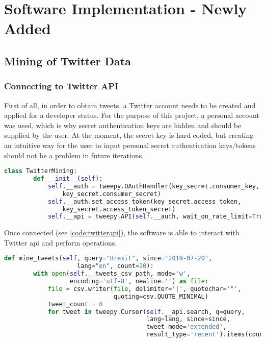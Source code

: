\section{Software Implementation - Newly Added}
    
    \subsection{Mining of Twitter Data} \label{twitterdata}
        \subsubsection{Connecting to Twitter API}
            First of all, in order to obtain tweets, a Twitter account needs to be created and applied for a developer status. For the purpose of this project, a personal account was used, which is why secret authentication keys are hidden and should be supplied by the user. At the moment, the secret key is hard coded, but creating an intuitive way for the user to input personal secret authentication keys/tokens should not be a problem in future iterations.
            
            \begin{lstlisting}[language=Python, caption=Connecting Twitter API, label=code:twitterapi]
    class TwitterMining:
        def __init__(self):
            self.__auth = tweepy.OAuthHandler(key_secret.consumer_key, 
                key_secret.consumer_secret)
            self.__auth.set_access_token(key_secret.access_token, 
                key_secret.access_token_secret)
            self.__api = tweepy.API(self.__auth, wait_on_rate_limit=True)
            \end{lstlisting}
            \FloatBarrier
            
            Once connected (see \cref{code:twitterapi}), the software is able to interact with Twitter \gls{api} and perform operations.
            
            \begin{lstlisting}[language=Python, caption=Starting Data Mining, label=code:twitterstream]
    def mine_tweets(self, query="Brexit", since="2019-07-20",
                    lang="en", count=20):
        with open(self.__tweets_csv_path, mode='w',
                  encoding='utf-8', newline='') as file:
            file = csv.writer(file, delimiter='|', quotechar='"',
                              quoting=csv.QUOTE_MINIMAL)
            tweet_count = 0
            for tweet in tweepy.Cursor(self.__api.search, q=query,
                                       lang=lang, since=since,
                                       tweet_mode='extended',
                                       result_type='recent').items(count):
            \end{lstlisting}
            \FloatBarrier
            

